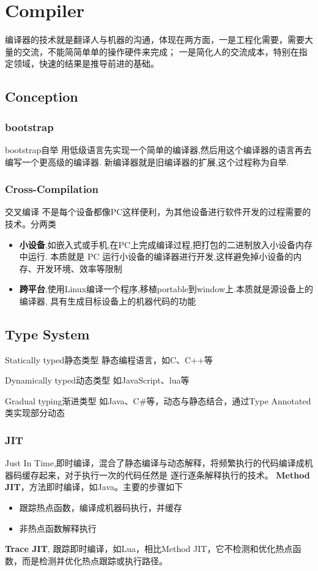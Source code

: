 \chapter{Compiler}
编译器的技术就是翻译人与机器的沟通，体现在两方面，一是工程化需要，需要大量的交流，不能简简单单的操作硬件来完成；
一是简化人的交流成本，特别在指定领域，快速的结果是推导前进的基础。

\section{Conception}

\subsection{bootstrap}
bootstrap自举
用低级语言先实现一个简单的编译器,然后用这个编译器的语言再去编写一个更高级的编译器.
新编译器就是旧编译器的扩展,这个过程称为自举.

\subsection{Cross-Compilation}
交叉编译
不是每个设备都像PC这样便利，为其他设备进行软件开发的过程需要的技术。分两类
\begin{itemize}
    \item {\textbf{小设备},如嵌入式或手机,在PC上完成编译过程,把打包的二进制放入小设备内存中运行.
    本质就是 PC 运行小设备的编译器进行开发,这样避免掉小设备的内存、开发环境、效率等限制}
    \item {\textbf{跨平台},使用Linux编译一个程序,移植portable到window上.本质就是源设备上的编译器,
    具有生成目标设备上的机器代码的功能}
\end{itemize}

\section{Type System}

Statically typed静态类型
静态编程语言，如C、C++等

Dynamically typed动态类型
如JavaScript、lua等

Gradual typing渐进类型\cite{AbstractingGradualTyping}
如Java、C\#等，动态与静态结合，通过Type Annotated类实现部分动态

\subsection{JIT}
Just In Time,即时编译，混合了静态编译与动态解释，将频繁执行的代码编译成机器码缓存起来，对于执行一次的代码任然是
逐行逐条解释执行的技术。
\newline
\textbf{Method JIT}，方法即时编译，如Java。主要的步骤如下
\begin{itemize}
    \item {跟踪热点函数，编译成机器码执行，并缓存}
    \item {非热点函数解释执行}
\end{itemize}
\textbf{Trace JIT}, 跟踪即时编译，如Lua，相比Method JIT，它不检测和优化热点函数，而是检测并优化热点跟踪或执行路径。

